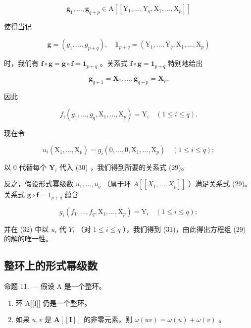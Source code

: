 \[
\boldsymbol {g} _ {1}, \dots , \boldsymbol {g} _ {q + p} \in \mathrm{A} \left[ \left[ \mathrm{Y} _ {1}, \dots , \mathrm{Y} _ {q}, \mathrm{X} _ {1}, \dots , \mathrm{X} _ {p} \right] \right]
\]

使得当记

\[
\mathbf {g} = \left(g _ {1}, \dots , g _ {p + q}\right), \quad \mathbf {1} _ {p + q} = \left(\mathrm{Y} _ {1}, \dots , \mathrm{Y} _ {q}, \mathrm{X} _ {1}, \dots , \mathrm{X} _ {p}\right)
\]

时，我们有 \(\mathbf{f} \circ \mathbf{g} = \mathbf{g} \circ \mathbf{f} = \mathbf{1}_{p + q}\) 。关系式 \(\mathbf{f} \circ \mathbf{g} = \mathbf{1}_{p + q}\) 特别地给出

\[
\boldsymbol {g} _ {q + 1} = \mathbf {X} _ {1}, \dots , \boldsymbol {g} _ {q + p} = \mathbf {X} _ {p}.
\]

因此

\[
f _ {i} \left(g _ {1}, \dots , g _ {q}, \mathrm{X} _ {1}, \dots , \mathrm{X} _ {p}\right) = \mathrm{Y} _ {i} \quad (1 \leqslant i \leqslant q).\tag{30}
\]

现在令

\[
u _ {i} \left(\mathrm{X} _ {1}, \dots , \mathrm{X} _ {p}\right) = g _ {i} (0, \dots , 0, \mathrm{X} _ {1}, \dots , \mathrm{X} _ {p}) \quad (1 \leqslant i \leqslant q);\tag{31}
\]

以 0 代替每个 \(\mathbf{Y}_i\) 代入 (30) ，我们得到所要的关系式 (29)。

反之，假设形式幂级数 \(u_1, \ldots, u_q\) （属于环 \(A[[X_1, \ldots, X_p]]\) ）满足关系式 (29)。关系式 \(\mathbf{g} \circ \mathbf{f} = 1_{p + q}\) 蕴含

\[
g _ {i} (f _ {1}, \dots , f _ {q}, \mathrm{X} _ {1}, \dots , \mathrm{X} _ {p}) = \mathrm{Y} _ {i} \quad (1 \leqslant i \leqslant q);\tag{32}
\]

并在 (32) 中以 \(u_{i}\) 代 \(Y_{i}\) （对 \(1 \leqslant i \leqslant q\) ），我们得到 (31)，由此得出方程组 (29) 的解的唯一性。

\subsection{整环上的形式幂级数}

命题 11. --- 假设 A 是一个整环。

\begin{enumerate}
\def\labelenumi{(\roman{enumi})}
\item
  环 A{[}{[}I{]}{]} 仍是一个整环。
\item
  如果 \(u, v\) 是 \(\mathbf{A}[[\mathbf{I}]]\) 的非零元素，则 \(\omega(uv) = \omega(u) + \omega(v)\) 。
\end{enumerate}


